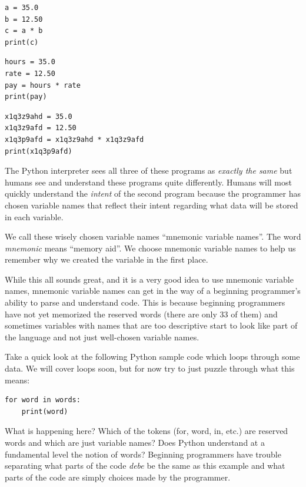 \begin{Verbatim}[frame=single]
a = 35.0
b = 12.50
c = a * b
print(c)
\end{Verbatim}

\begin{Verbatim}[frame=single]
hours = 35.0
rate = 12.50
pay = hours * rate
print(pay)
\end{Verbatim}

\begin{Verbatim}[frame=single]
x1q3z9ahd = 35.0
x1q3z9afd = 12.50
x1q3p9afd = x1q3z9ahd * x1q3z9afd
print(x1q3p9afd)
\end{Verbatim}

The Python interpreter sees all three of these programs as \emph{exactly the same} but humans see and understand these programs quite differently. Humans will most quickly understand the \emph{intent } of the second program because the programmer has chosen variable names that reflect their intent regarding what data will be stored in each variable.

We call these wisely chosen variable names ``mnemonic variable names''. The word
\emph{mnemonic} means  ``memory aid''.
We choose mnemonic variable names to help us remember why we created the variable in the first place.

While this all sounds great, and it is a very good idea to use mnemonic variable names, mnemonic variable names can get in the way of a beginning programmer's ability to parse and understand code. This is because beginning programmers have not yet memorized the reserved words (there are only 33 of them) and sometimes variables with names that are too descriptive start to look like part of the language and not just well-chosen variable names.

Take a quick look at the following Python sample code which loops through some data. We will cover loops soon, but for now try to just puzzle through what this means:

\begin{Verbatim}[frame=single]
for word in words:
    print(word)
\end{Verbatim}

What is happening here? Which of the tokens (for, word, in, etc.) are reserved words and which are just variable names? Does Python understand at a fundamental level the notion of words? Beginning programmers have trouble separating what parts of the code \emph{debe} be the same as this example and what parts of the code are simply choices made by the programmer.

